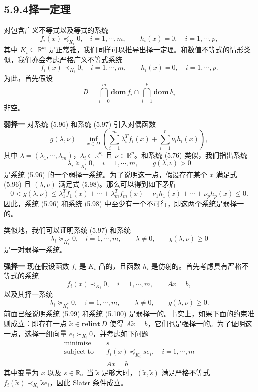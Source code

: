 \documentclass[UTF8, 12pt, fontset=fandol, oneside]{ctexart}
\begin{document}
\subsection*{5.9.4\quad 择一定理}

对包含广义不等式以及等式的系统
\begin{equation}
f_i(x)\preceq_{K_i}0,\quad i=1,\cdots,m,\qquad h_i(x)=0,\quad i=1,\cdots,p,
\tag{5.96}
\end{equation}
其中 $K_i\subseteq\mathbb{R}^{k_i}$ 是正常锥，我们同样可以推导出择一定理。和数值不等式的情形类似，我们亦会考虑严格广义不等式系统
\begin{equation}
f_i(x)\prec_{K_i}0,\quad i=1,\cdots,m,\qquad h_i(x)=0,\quad i=1,\cdots,p.
\tag{5.97}
\end{equation}
为此，首先假设
\[
D=\bigcap_{i=0}^m \mathbf{dom}\,f_i\cap\bigcap_{i=1}^p \mathbf{dom}\,h_i
\]
非空。

\noindent\textbf{弱择一}\quad
对系统 (5.96) 和系统 (5.97) 引入对偶函数
\[
g(\lambda,\nu)=\inf_{x\in D}\left(\sum_{i=1}^m\lambda_i^Tf_i(x)+\sum_{i=1}^p\nu_i h_i(x)\right),
\]
其中 $\lambda=(\lambda_1,\cdots,\lambda_m)$，$\lambda_i\in\mathbb{R}^{k_i}$ 且 $\nu\in\mathbb{R}^p$。和系统 (5.76) 类似，我们指出系统
\begin{equation}
\lambda_i\succeq_{K_i^\ast}0,\quad i=1,\cdots,m,\qquad g(\lambda,\nu)>0
\tag{5.98}
\end{equation}
是系统 (5.96) 的一个弱择一系统。为了说明这一点，假设存在某个 $x$ 满足式 (5.96) 且 $(\lambda,\nu)$ 满足式 (5.98)。那么可以得到如下矛盾
\[
0<g(\lambda,\nu)\leq \lambda_1^Tf_1(x)+\cdots+\lambda_m^Tf_m(x)+\nu_1h_1(x)+\cdots+\nu_ph_p(x)\leq 0.
\]
因此，系统 (5.96) 和系统 (5.98) 中至少有一个不可行，即这两个系统是弱择一的。

类似地，我们可以证明系统 (5.97) 和系统
\[
\lambda_i\succeq_{K_i^\ast}0,\quad i=1,\cdots,m,\qquad \lambda\neq 0,\qquad g(\lambda,\nu)\geq 0
\]
是一对弱择一系统。

\noindent\textbf{强择一}\quad
现在假设函数 $f_i$ 是 $K_i$-凸的，且函数 $h_i$ 是仿射的。首先考虑具有严格不等式的系统
\begin{equation}
f_i(x)\prec_{K_i}0,\quad i=1,\cdots,m,\qquad Ax=b,
\tag{5.99}
\end{equation}
以及其择一系统
\begin{equation}
\lambda_i\succeq_{K_i^\ast}0,\quad i=1,\cdots,m,\qquad \lambda\neq 0,\qquad g(\lambda,\nu)\geq 0.
\tag{5.100}
\end{equation}
前面已经说明系统 (5.99) 和系统 (5.100) 是弱择一的。事实上，如果下面的约束准则成立：即存在一点 $\tilde{x}\in\mathbf{relint}\,D$ 使得 $A\tilde{x}=b$，它们也是强择一的。为了证明这一点，选择一组向量 $e_i\succ_{K_i}0$，并考虑如下问题
\begin{equation}
\begin{aligned}
\text{minimize}\quad & s\\
\text{subject to}\quad & f_i(x)\preceq_{K_i}se_i,\quad i=1,\cdots,m\\
& Ax=b
\end{aligned}
\tag{5.101}
\end{equation}
其中变量为 $x$ 以及 $s\in\mathbb{R}$。当 $\tilde{s}$ 足够大时，$(\tilde{x},\tilde{s})$ 满足严格不等式 $f_i(\tilde{x})\prec_{K_i}\tilde{s}e_i$，因此 Slater 条件成立。
\end{document}
